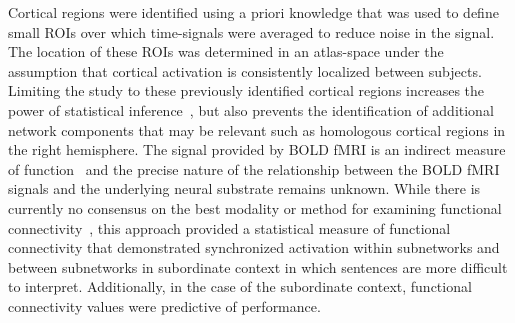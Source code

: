 Cortical regions were identified using a priori knowledge that was used to define small ROIs over which time-signals were averaged to reduce noise in the signal. The location of these ROIs was determined in an atlas-space under the assumption that cortical activation is consistently localized between subjects. Limiting the study to these previously identified cortical regions increases the power of statistical inference~\cite{Rykhlevskaia2008}, but also prevents the identification of additional network components that may be relevant such as homologous cortical regions in the right hemisphere. The signal provided by BOLD fMRI is an indirect measure of function~\cite{Ogawa1990} and the precise nature of the relationship between the BOLD fMRI signals and the underlying neural substrate remains unknown. While there is currently no consensus on the best modality or method for examining functional connectivity~\cite{Horwitz2003}, this approach provided a statistical measure of functional connectivity that demonstrated synchronized activation within subnetworks and between subnetworks in subordinate context in which sentences are more difficult to interpret. Additionally, in the case of the subordinate context, functional connectivity values were predictive of performance.


